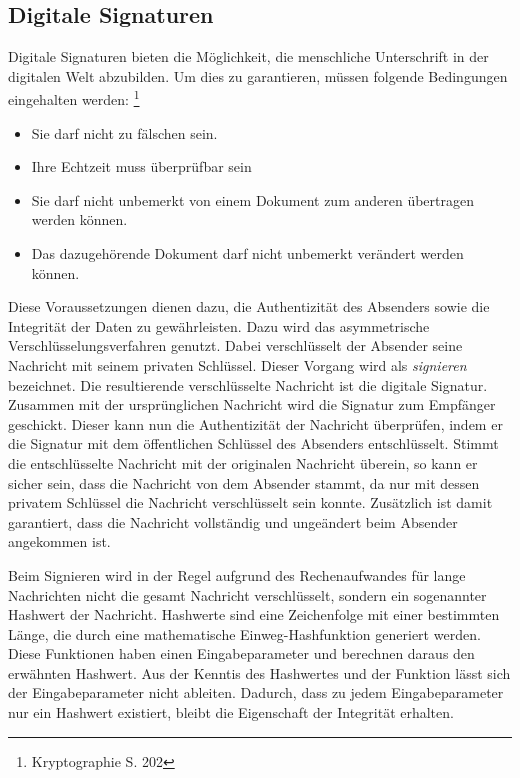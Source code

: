 \documentclass  [paper=a4,
				fontsize=12pt,
				listof=totoc,
				bibliography=totoc
				]{scrreprt}
\begin{document}
			\subsection{Digitale Signaturen}\label{chp: Signatur}	
				Digitale Signaturen bieten die Möglichkeit, die menschliche Unterschrift in der digitalen Welt abzubilden. Um dies zu garantieren, müssen folgende Bedingungen eingehalten werden:
				\footnote{Kryptographie S. 202}
				\begin{itemize}
					\item Sie darf nicht zu fälschen sein.
					\item Ihre Echtzeit muss überprüfbar sein
					\item Sie darf nicht unbemerkt von einem Dokument zum anderen übertragen werden können.
					\item Das dazugehörende Dokument darf nicht unbemerkt verändert werden können.
				\end{itemize}
				Diese Voraussetzungen dienen dazu, die Authentizität des Absenders sowie die Integrität der Daten zu gewährleisten. Dazu wird das asymmetrische Verschlüsselungsverfahren genutzt. Dabei verschlüsselt der Absender seine Nachricht mit seinem privaten Schlüssel. Dieser Vorgang wird als \textit{signieren} bezeichnet. Die resultierende verschlüsselte Nachricht ist die digitale Signatur. Zusammen mit der ursprünglichen Nachricht wird die Signatur zum Empfänger geschickt. Dieser kann nun die Authentizität der Nachricht überprüfen, indem er die Signatur mit dem öffentlichen Schlüssel des Absenders entschlüsselt. Stimmt die entschlüsselte Nachricht mit der originalen Nachricht überein, so kann er sicher sein, dass die Nachricht von dem Absender stammt, da nur mit dessen privatem Schlüssel die Nachricht verschlüsselt sein konnte. Zusätzlich ist damit garantiert, dass die Nachricht vollständig und ungeändert beim Absender angekommen ist.
				
				Beim Signieren wird in der Regel aufgrund des Rechenaufwandes für lange Nachrichten nicht die gesamt Nachricht verschlüsselt, sondern ein sogenannter Hashwert der Nachricht. Hashwerte sind eine Zeichenfolge mit einer bestimmten Länge, die durch eine mathematische Einweg-Hashfunktion generiert werden. Diese Funktionen haben einen Eingabeparameter und berechnen daraus den erwähnten Hashwert. Aus der Kenntis des Hashwertes und der Funktion lässt sich der Eingabeparameter nicht ableiten. Dadurch, dass zu jedem Eingabeparameter nur ein Hashwert existiert, bleibt die Eigenschaft der Integrität erhalten.
	
\end{document}
